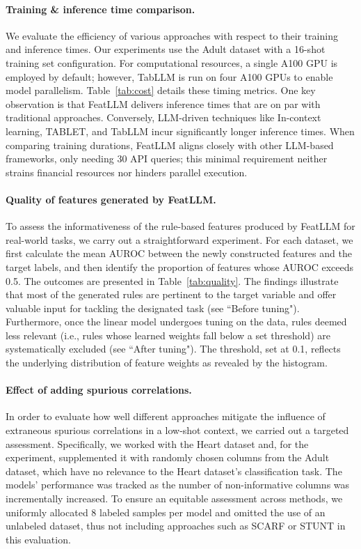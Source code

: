 \vspace*{-0.12in}
\paragraph{Training \& inference time comparison.} We evaluate the efficiency of various approaches with respect to their training and inference times. Our experiments use the Adult dataset with a 16-shot training set configuration. For computational resources, a single A100 GPU is employed by default; however, TabLLM is run on four A100 GPUs to enable model parallelism. Table~\ref{tab:cost} details these timing metrics. One key observation is that \textsf{FeatLLM} delivers inference times that are on par with traditional approaches. Conversely, LLM-driven techniques like In-context learning, TABLET, and TabLLM incur significantly longer inference times. When comparing training durations, \textsf{FeatLLM} aligns closely with other LLM-based frameworks, only needing 30 API queries; this minimal requirement neither strains financial resources nor hinders parallel execution.

\vspace*{-0.12in}
\paragraph{Quality of features generated by \textsf{FeatLLM}.}
To assess the informativeness of the rule-based features produced by \textsf{FeatLLM} for real-world tasks, we carry out a straightforward experiment. For each dataset, we first calculate the mean AUROC between the newly constructed features and the target labels, and then identify the proportion of features whose AUROC exceeds 0.5. The outcomes are presented in Table~\ref{tab:quality}. The findings illustrate that most of the generated rules are pertinent to the target variable and offer valuable input for tackling the designated task (see ``Before tuning"). Furthermore, once the linear model undergoes tuning on the data, rules deemed less relevant (i.e., rules whose learned weights fall below a set threshold) are systematically excluded (see ``After tuning"). The threshold, set at 0.1, reflects the underlying distribution of feature weights as revealed by the histogram.

\vspace*{-0.12in}
\paragraph{Effect of adding spurious correlations.} In order to evaluate how well different approaches mitigate the influence of extraneous spurious correlations in a low-shot context, we carried out a targeted assessment. Specifically, we worked with the Heart dataset and, for the experiment, supplemented it with randomly chosen columns from the Adult dataset, which have no relevance to the Heart dataset's classification task. The models' performance was tracked as the number of non-informative columns was incrementally increased. To ensure an equitable assessment across methods, we uniformly allocated 8 labeled samples per model and omitted the use of an unlabeled dataset, thus not including approaches such as SCARF or STUNT in this evaluation.

